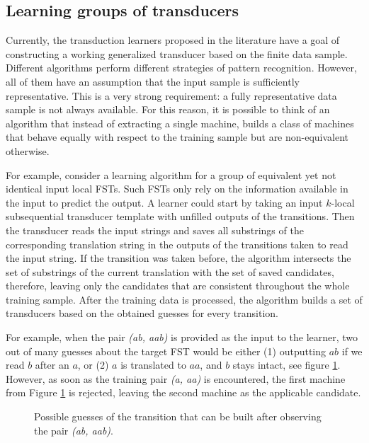 \subsection{Learning groups of transducers}

Currently, the transduction learners proposed in the literature have a goal of constructing a working generalized transducer based on the finite data sample.
Different algorithms perform different strategies of pattern recognition.
However, all of them have an assumption that the input sample is sufficiently representative.
This is a very strong requirement: a fully representative data sample is not always available.
For this reason, it is possible to think of an algorithm that instead of extracting a single machine, builds a class of machines that behave equally with respect to the training sample but are non-equivalent otherwise.

For example, consider a learning algorithm for a group of equivalent yet not identical input local FSTs.
Such FSTs only rely on the information available in the input to predict the output.
A learner could start by taking an input $k$-local subsequential transducer template with unfilled outputs of the transitions.
Then the transducer reads the input strings and saves all substrings of the corresponding translation string in the outputs of the transitions taken to read the input string.
If the transition was taken before, the algorithm intersects the set of substrings of the current translation with the set of saved candidates, therefore, leaving only the candidates that are consistent throughout the whole training sample.
After the training data is processed, the algorithm builds a set of transducers based on the obtained guesses for every transition.

For example, when the pair \emph{(ab, aab)} is provided as the input to the learner, two out of many guesses about the target FST would be either (1) outputting $ab$ if we read $b$ after an $a$, or (2) $a$ is translated to $aa$, and $b$ stays intact, see figure \ref{fig:two_opt}.
However, as soon as the training pair \emph{(a, aa)} is encountered, the first machine from Figure \ref{fig:two_opt} is rejected, leaving the second machine as the applicable candidate.

\begin{figure}[h!] 
\centering
{}
\caption{Possible guesses of the transition that can be built after observing the pair \emph{(ab, aab)}.}
\label{fig:two_opt}
\end{figure}

